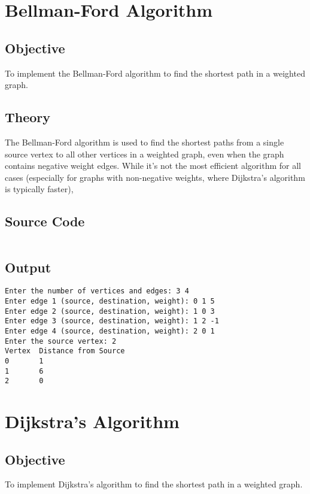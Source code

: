 \documentclass{korigamik}
\begin{document}
\section{Bellman-Ford Algorithm}
\label{sec:Bellman-Ford Algorithm}

\subsection{Objective}
To implement the Bellman-Ford algorithm to find the shortest path
in a weighted graph.

\subsection{Theory}
The Bellman-Ford algorithm is used to find the shortest paths from a 
single source vertex to all other vertices in a weighted graph, even when the
graph contains negative weight edges. While it's not the most efficient
algorithm for all cases (especially for graphs with non-negative weights, where
Dijkstra's algorithm is typically faster),

\subsection{Source Code}
\inputminted[firstline=6, lastline=55, fontsize=\footnotesize]{cpp}{code/bellmanford.cpp}

\subsection{Output}
\begin{lstlisting}[style=output]
Enter the number of vertices and edges: 3 4
Enter edge 1 (source, destination, weight): 0 1 5
Enter edge 2 (source, destination, weight): 1 0 3
Enter edge 3 (source, destination, weight): 1 2 -1
Enter edge 4 (source, destination, weight): 2 0 1
Enter the source vertex: 2
Vertex  Distance from Source
0       1
1       6
2       0
\end{lstlisting}

\pagebreak

\section{Dijkstra's Algorithm}
\label{sec:Dijkstra's Algorithm}

\subsection{Objective}
To implement Dijkstra's algorithm to find the shortest path
in a weighted graph.
\end{document}
